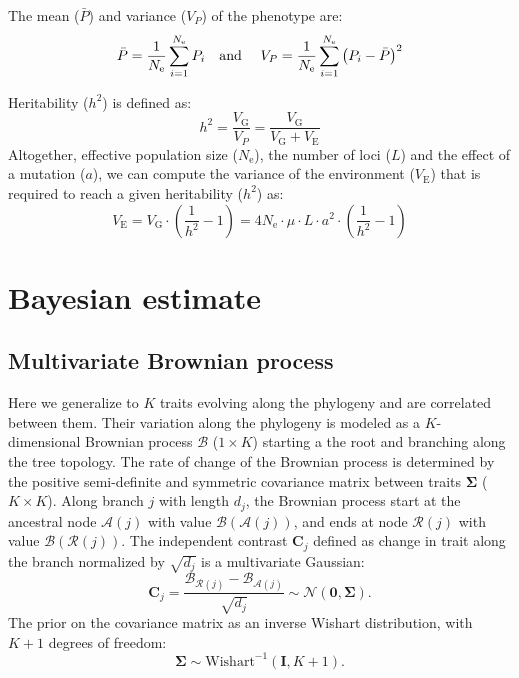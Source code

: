 \documentclass{article}
\newcommand{\Multiply}{\cdot}
\newcommand{\UniDimArray}[1]{\bm{#1}}
\newcommand{\BiDimArray}[1]{\bm{#1}}
\newcommand{\Ne}{N_{\text{e}}}
\newcommand{\Trait}{P}
\newcommand{\Heritability}{h^2}
\newcommand{\VecZero}{\UniDimArray{0}}
\newcommand{\MutationRate}{\mu}
\newcommand{\NbrLoci}{L}
\newcommand{\VarPhenotype}{V_{\Trait}}
\newcommand{\VarGenetic}{V_{\mathrm{G}}}
\newcommand{\VarEnv}{V_{\mathrm{E}}}
\newcommand{\Ntrait}{K}
\newcommand{\contrast}{\UniDimArray{C}}
\newcommand{\Covariancematrix}{\Sigma}
\newcommand{\CovarianceMatrix}{\BiDimArray{\Covariancematrix}}
\newcommand{\Identitymatrix}{\BiDimArray{I}}
\newcommand{\brownian}{\mathcal{B}}
\newcommand{\Brownian}{\UniDimArray{\brownian}}
\begin{document}
The mean ($\bar{\Trait}$) and variance ($\VarPhenotype$) of the phenotype are:
\begin{equation}
    \bar{\Trait} = \frac{1}{\Ne}\sum_{i=1}^{\Ne} \Trait_i \text{\quad and \quad} \VarPhenotype = \frac{1}{\Ne}\sum_{i=1}^{\Ne}\left(\Trait_i - \bar{\Trait} \right)^2 \label{eq:simu-between}
\end{equation}

Heritability ($\Heritability$) is defined as:
\begin{equation}
    \Heritability = \frac{\VarGenetic}{\VarPhenotype} = \frac{\VarGenetic}{\VarGenetic + \VarEnv}\label{eq:simu-heritability}
\end{equation}
Altogether, effective population size ($\Ne$), the number of loci ($\NbrLoci$) and the effect of a mutation ($a$), we can compute the variance of the environment ($\VarEnv$) that is required to reach a given heritability ($\Heritability$) as:
\begin{equation}
    \VarEnv = \VarGenetic \Multiply \left( \frac{1}{\Heritability} - 1 \right) = 4 \Ne \Multiply \MutationRate \Multiply \NbrLoci \Multiply a^2 \Multiply \left( \frac{1}{\Heritability} - 1 \right) \label{eq:simu-var-env}
\end{equation}

\newpage
\section{Bayesian estimate}\label{sec:bayesian-estimate}

\subsection{Multivariate Brownian process}\label{subsec:multivariate-brownian-process}
Here we generalize to $\Ntrait$ traits evolving along the phylogeny and are correlated between them.
Their variation along the phylogeny is modeled as a $\Ntrait$-dimensional Brownian process $\Brownian$ ($1 \times \Ntrait$) starting a the root and branching along the tree topology.
The rate of change of the Brownian process is determined by the positive semi-definite and symmetric covariance matrix between traits $\CovarianceMatrix$ ($\Ntrait \times \Ntrait$).
Along branch $j$ with length $d_{j}$, the Brownian process start at the ancestral node $\mathcal{A}(j)$ with value $\Brownian(\mathcal{A}(j))$, and ends at node $\mathcal{R}(j)$  with value $\Brownian(\mathcal{R}(j))$.
The independent contrast $\contrast_{j}$ defined as change in trait along the branch normalized by $\sqrt {d_{j}}$ is a multivariate Gaussian:
\begin{equation}
    \label{eq:DistribBrownian}
    \contrast_{j} = \frac{\Brownian_{\mathcal{R}(j)} - \Brownian_{\mathcal{A}(j)} }{\sqrt {d_{j}}} \sim \mathcal{N}\left(\VecZero, \CovarianceMatrix \right).
\end{equation}
The {prior} on the covariance matrix as an inverse Wishart distribution, with $\Ntrait + 1$ degrees of freedom:
\begin{equation}
    \label{eq:Distribcovariance}
    \CovarianceMatrix \sim \text{Wishart}^{-1} (\Identitymatrix, \Ntrait + 1).
\end{equation}
\end{document}
